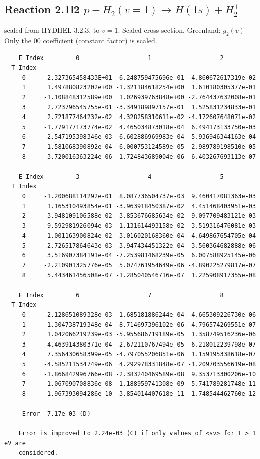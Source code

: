 \documentclass[12pt,dvipdfmx]{article}
\begin{document}
\subsection{
Reaction 2.1l2 $   p + H_2(v=1) \rightarrow H(1s) + H_2^+$}
scaled from HYDHEL 3.2.3, to $v=1$. Scaled cross section, Greenland: $g_2(v)$
Only the 00 coefficient (constant factor) is scaled.


\begin{small}\begin{verbatim}
    E Index         0                   1                   2
  T Index
     0     -2.327365458433E+01  6.248759475696e-01  4.860672617319e-02
     1      1.497880823202e+00 -1.321184618254e+00  1.610180305377e-01
     2     -1.108848312589e+00  1.026939763848e+00 -2.764437632008e-01
     3      2.723796545755e-01 -3.349189897157e-01  1.525831234833e-01
     4      2.721877464232e-02  4.328258310611e-02 -4.172607648071e-02
     5     -1.779177173774e-02  4.465034873018e-04  6.494173133750e-03
     6      2.547195398346e-03 -6.602886969983e-04 -5.936946344163e-04
     7     -1.581068390892e-04  6.000753124589e-05  2.989789198510e-05
     8      3.720016363224e-06 -1.724843689004e-06 -6.403267693113e-07

    E Index         3                   4                   5
  T Index
     0     -1.200688114292e-01  8.087736504737e-03  9.460417081363e-03
     1      1.165310493854e-01 -3.963918450387e-02  4.451468403951e-03
     2     -3.948109106588e-02  3.853676685634e-02 -9.097709483121e-03
     3     -9.592981926094e-03 -1.131614493158e-02  3.519316476081e-03
     4      1.001163900824e-02  3.016020168360e-04 -4.649867654705e-04
     5     -2.726517864643e-03  3.947434451322e-04 -3.560364682888e-06
     6      3.516907384191e-04 -7.253981468239e-05  6.007588925145e-06
     7     -2.210901325776e-05  5.074761954649e-06 -4.890225279817e-07
     8      5.443461456508e-07 -1.285040546716e-07  1.225908917355e-08

    E Index         6                   7                   8
  T Index
     0     -2.128651089328e-03  1.685181886244e-04 -4.665309226730e-06
     1     -1.304738719348e-04 -8.714697396102e-06  4.796574269551e-07
     2      1.042066219239e-03 -5.955686719189e-05  1.358749516236e-06
     3     -4.463914380371e-04  2.672110767494e-05 -6.218012239798e-07
     4      7.356430658399e-05 -4.797055206851e-06  1.159195338618e-07
     5     -4.585211534749e-06  4.292978331848e-07 -1.209703556619e-08
     6     -1.866842996766e-08 -2.383240469589e-08  9.353713300206e-10
     7      1.067090708836e-08  1.188959741308e-09 -5.741789281748e-11
     8     -1.967393094286e-10 -3.854014407618e-11  1.748544462760e-12

     Error  7.17e-03 (D)

    Error is improved to 2.24e-03 (C) if only values of <sv> for T > 1 eV are
    considered.
\end{verbatim}\end{small}
\newpage
\end{document}
